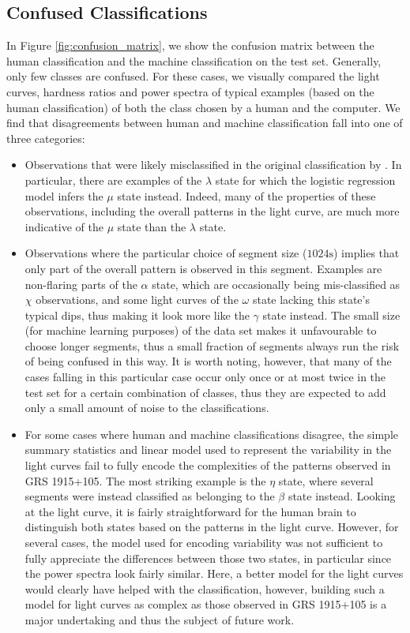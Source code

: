 \documentclass[12pt]{emulateapj}
\begin{document}
\subsection{Confused Classifications}
\label{sec:confusion}

In Figure \ref{fig:confusion_matrix}, we show the confusion matrix between the human classification and the machine classification on the 
test set. Generally, only few classes are confused. For these cases, we visually compared the light curves, hardness ratios and power spectra of 
typical examples (based on the human classification) of both the class chosen by a human and the computer. We find that disagreements between 
human and machine classification fall into one of three categories:
\begin{itemize}
\item{Observations that were likely misclassified in the original classification by \citet{belloni2000}. In particular, there are examples of the 
$\lambda$ state for which the logistic regression model infers the $\mu$ state instead. Indeed, many of the properties of these observations, including 
the overall patterns in the light curve, are much more indicative of the $\mu$ state than the $\lambda$ state.}
\item{Observations where the particular choice of segment size ($1024\mathrm{s}$) implies that only part of the overall pattern is observed in this 
segment. Examples are non-flaring parts of the $\alpha$ state, which are occasionally being mis-classified as $\chi$ observations, and some light 
curves of the $\omega$ state lacking this state's typical dips, thus making it look more like the $\gamma$ state instead. The small size (for machine 
learning purposes) of the data set makes it unfavourable to choose longer segments, thus a small fraction of segments always run the risk of being 
confused in this way. It is worth noting, however, that many of the cases falling in this particular case occur only once or at most twice in the 
test set for a certain combination of classes, thus they are expected to add only a small amount of noise to the classifications.}
\item{For some cases where human and machine classifications disagree, the simple summary statistics and linear model used to represent the variability
 in the light curves fail to fully encode the complexities of the patterns observed in GRS 1915+105. The most striking example is the $\eta$ state, where several 
 segments were instead classified as belonging to the $\beta$ state instead. Looking at the light curve, it is fairly straightforward for the human brain to distinguish 
 both states based on the patterns in the light curve. However, for several cases, the model used for encoding variability was not sufficient to fully appreciate the differences between those two states, in particular since the power spectra look fairly similar. Here, a better model for the light curves would clearly have helped with the classification, however, building such a model for light curves as complex as those observed in GRS 1915+105 is a major undertaking and thus the subject of future work.}
\end{itemize}
\end{document}
